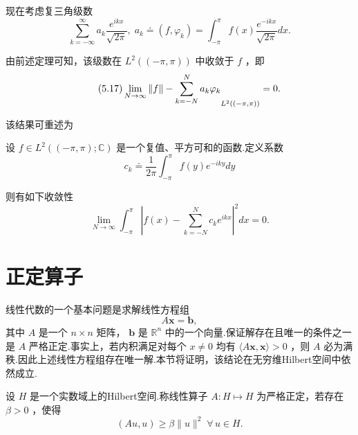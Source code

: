 现在考虑复三角级数
\begin{equation}\tag{5.16}\label{eq:complex-fourier-series}
\sum\limits_{{k =  - \infty }}^{\infty }{a}_{k}\frac{{e}^{ikx}}{\sqrt{2\pi }},\;{a}_{k} \doteq  \left( {f,{\varphi }_{k}}\right)  = {\int }_{-\pi }^{\pi }f\left( x\right) \frac{{e}^{-{ikx}}}{\sqrt{2\pi }}{dx}.
\end{equation}

由前述定理可知，该级数在 ${L}^{2}\left( \left(  {-\pi ,\pi }\right)  \right)$ 中收敛于 $f$ ，即
\begin{equation}\tag{5.17}\label{eq:fourier-L2-convergence}
\mathop{\lim }\limits_{{N \rightarrow  \infty }}{\norm{f} - \sum\limits_{{k =  - N}}^{N}{a}_{k}{\varphi }_{k}}_{{L}^{2}\left( \left(  {-\pi ,\pi }\right)  \right) } = 0.
\end{equation}

该结果可重述为
\begin{corollary}\label{cor:fourier-L2-convergence}
设 $f \in  {L}^{2}\left( {\left(  {-\pi ,\pi }\right)  ;\mathbb{C}}\right)$ 是一个复值、平方可和的函数.定义系数
\[
{c}_{k} \doteq  \frac{1}{2\pi }{\int }_{-\pi }^{\pi }f\left( y\right) {e}^{-{iky}}{dy}
\]

则有如下收敛性
\[
\mathop{\lim }\limits_{{N \rightarrow  \infty }}{\int }_{-\pi }^{\pi }{\left| f\left( x\right)  - \sum\limits_{{k =  - N}}^{N}{c}_{k}{e}^{ikx}\right| }^{2}{dx} = 0.
\]
\end{corollary}

\section{正定算子}

线性代数的一个基本问题是求解线性方程组
\[
A\bm{x} = \bm{b},
\]
其中 $A$ 是一个 $n \times  n$ 矩阵， $\bm{b}$ 是 ${\mathbb{R}}^{n}$ 中的一个向量.保证解存在且唯一的条件之一是 $A$ 严格正定.事实上，若内积满足对每个 $x \neq  0$ 均有 $\langle A\bm{x},\bm{x}\rangle  > 0$ ，则 $A$ 必为满秩.因此上述线性方程组存在唯一解.本节将证明，该结论在无穷维Hilbert空间中依然成立.

\begin{definition}\label{def:strictly-positive-definite-operator}
设 $H$ 是一个实数域上的Hilbert空间.称线性算子 $A : H \mapsto  H$ 为严格正定\footnotemark，若存在 $\beta  > 0$ ，使得
\begin{equation}\tag{5.18}\label{eq:strictly-positive-definite}
\left( {{Au},u}\right)  \geq  \beta \| u{\| }^{2}\;\forall\,u \in  H.
\end{equation}
\end{definition}

